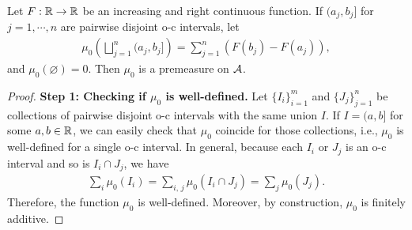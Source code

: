 \begin{lem}
    Let $F: {\mathbb{R}}\rightarrow{\mathbb{R}}$ be an increasing and right continuous function.
    If $(a_j, b_j]$ for $j=1, \cdots, n$ are pairwise disjoint o-c intervals, let
    \begin{align*}
        \mu_0\left(\bigsqcup_{j=1}^n (a_j, b_j]\right)=\sum_{j=1}^n(F(b_j)-F(a_j)),
    \end{align*}
    and $\mu_0(\varnothing)=0$.
    Then $\mu_0$ is a premeasure on ${\mathcal{A}}$.
\end{lem}
\begin{proof}
    \textbf{Step 1: Checking if $\mu_0$ is well-defined.}\newline\noindent
    Let $\{I_i\}_{i=1}^m$ and $\{J_j\}_{j=1}^n$ be collections of pairwise disjoint o-c intervals with the same union $I$.
    If $I=(a, b]$ for some $a, b\in{\mathbb{R}}$, we can easily check that $\mu_0$ coincide for those collections, i.e., $\mu_0$ is well-defined for a single o-c interval.
    In general, because each $I_i$ or $J_j$ is an o-c interval and so is $I_i\cap J_j$, we have
    \begin{align*}
        \sum_i\mu_0(I_i)=\sum_{i,\,j}\mu_0(I_i\cap J_j)=\sum_j\mu_0(J_j).
    \end{align*}
    Therefore, the function $\mu_0$ is well-defined.
    Moreover, by construction, $\mu_0$ is finitely additive.


\end{proof}
